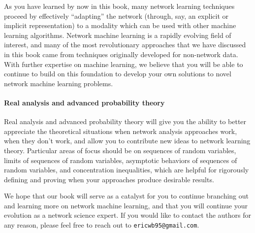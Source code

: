 As you have learned by now in this book, many network learning techniques proceed by effectively ``adapting'' the network (through, say, an explicit or implicit representation) to a modality which can be used with other machine learning algorithms. Network machine learning is a rapidly evolving field of interest, and many of the most revolutionary approaches that we have discussed in this book came from techniques originally developed for non-network data. With further expertise on machine learning, we believe that you will be able to continue to build on this foundation to develop your own solutions to novel network machine learning problems. 


\paragraph{Real analysis and advanced probability theory}

Real analysis and advanced probability theory will give you the ability to better appreciate the theoretical situations when network analysis approaches work, when they don't work, and allow you to contribute new ideas to network learning theory. Particular areas of focus should be on sequences of random variables, limits of sequences of random variables, asymptotic behaviors of sequences of random variables, and concentration inequalities, which are helpful for rigorously defining and proving when your approaches produce desirable results. 

We hope that our book will serve as a catalyst for you to continue branching out and learning more on network machine learning, and that you will continue your evolution as a network science expert. If you would like to contact the authors for any reason, please feel free to reach out to \texttt{ericwb95@gmail.com}.